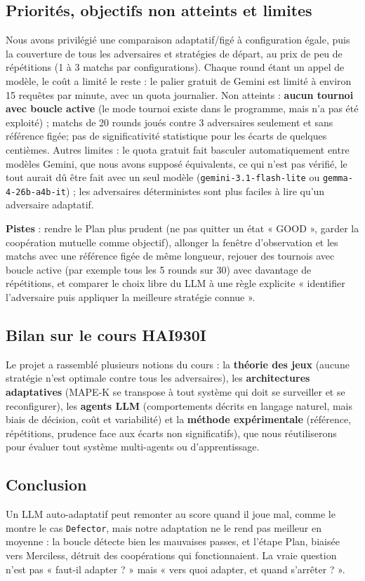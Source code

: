 \documentclass[10pt,a4paper]{article}
\begin{document}
\subsection{Priorités, objectifs non atteints et limites}

Nous avons privilégié une comparaison adaptatif/figé à configuration égale, puis la
couverture de tous les adversaires et stratégies de départ, au prix de peu de
répétitions (1 à 3 matchs par configurations). Chaque round étant un appel de modèle, le
coût a limité le reste : le palier gratuit de Gemini est limité à environ 15
requêtes par minute, avec un quota journalier. Non atteints : \textbf{aucun tournoi avec boucle active} (le mode tournoi
existe dans le programme, mais n'a pas été exploité) ; matchs de 20 rounds joués contre 3 adversaires seulement et sans
référence figée; pas de significativité statistique pour les écarts de
quelques centièmes. Autres limites : le quota gratuit fait
basculer automatiquement entre modèles Gemini, que nous avons
supposé équivalents, ce qui n'est pas vérifié, le tout aurait dû être fait avec un seul modèle (\texttt{gemini-3.1-flash-lite} ou \texttt{gemma-4-26b-a4b-it}) ; les
adversaires déterministes sont plus faciles à lire qu'un adversaire adaptatif.


\textbf{Pistes} : rendre le Plan plus prudent (ne pas quitter un état « GOOD »,
garder la coopération mutuelle comme objectif), allonger la fenêtre
d'observation et les matchs avec une référence figée de même longueur, rejouer des
tournois avec boucle active (par exemple tous les 5 rounds sur 30) avec davantage
de répétitions, et comparer le choix libre du LLM à une règle explicite
« identifier l'adversaire puis appliquer la meilleure stratégie connue ».

\subsection{Bilan sur le cours HAI930I}

Le projet a rassemblé plusieurs notions du cours : la \textbf{théorie des jeux}
(aucune stratégie n'est optimale contre tous les adversaires), les
\textbf{architectures adaptatives} (MAPE-K se transpose à tout système qui doit se
surveiller et se reconfigurer), les \textbf{agents LLM} (comportements décrits en
langage naturel, mais biais de décision, coût et variabilité) et la
\textbf{méthode expérimentale} (référence, répétitions, prudence face aux écarts
non significatifs), que nous réutiliserons pour évaluer tout système
multi-agents ou d'apprentissage.

\subsection{Conclusion}

Un LLM auto-adaptatif peut remonter au score quand il joue mal, comme le montre
le cas \texttt{Defector}, mais notre adaptation ne le rend pas meilleur en moyenne : la
boucle détecte bien les mauvaises passes, et l'étape Plan, biaisée vers
Merciless, détruit des coopérations qui fonctionnaient. La vraie question n'est
pas « faut-il adapter ? » mais « vers quoi adapter, et quand s'arrêter ? ».
\end{document}
